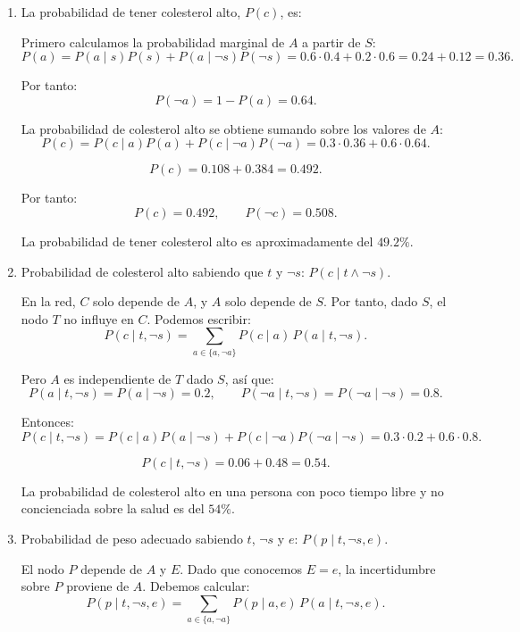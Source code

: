 \newpage
\begin{enumerate}[label=\alph*)]
\item La probabilidad de tener colesterol alto, $P(c)$, es:

Primero calculamos la probabilidad marginal de $A$ a partir de $S$:
\[
P(a) = P(a \mid s)P(s) + P(a \mid \lnot s)P(\lnot s)
     = 0.6 \cdot 0.4 + 0.2 \cdot 0.6
     = 0.24 + 0.12 = 0.36.
\]

Por tanto:
\[
P(\lnot a) = 1 - P(a) = 0.64.
\]

La probabilidad de colesterol alto se obtiene sumando sobre los valores de $A$:
\[
P(c) = P(c \mid a)P(a) + P(c \mid \lnot a)P(\lnot a)
     = 0.3 \cdot 0.36 + 0.6 \cdot 0.64.
\]

\[
P(c) = 0.108 + 0.384 = 0.492.
\]

Por tanto:
\[
P(c) = 0.492,\qquad P(\lnot c) = 0.508.
\]

La probabilidad de tener colesterol alto es aproximadamente del $49.2\%$. \\

\item Probabilidad de colesterol alto sabiendo que $t$ y $\lnot s$: $P(c \mid t \land \lnot s)$.

En la red, $C$ solo depende de $A$, y $A$ solo depende de $S$. Por tanto, dado $S$,
el nodo $T$ no influye en $C$. Podemos escribir:
\[
P(c \mid t, \lnot s) = \sum_{a \in \{a,\lnot a\}} P(c \mid a)\,P(a \mid t,\lnot s).
\]

Pero $A$ es independiente de $T$ dado $S$, así que:
\[
P(a \mid t,\lnot s) = P(a \mid \lnot s) = 0.2,\qquad
P(\lnot a \mid t,\lnot s) = P(\lnot a \mid \lnot s) = 0.8.
\]

Entonces:
\[
P(c \mid t,\lnot s) = P(c \mid a)P(a \mid \lnot s) + P(c \mid \lnot a)P(\lnot a \mid \lnot s)
= 0.3 \cdot 0.2 + 0.6 \cdot 0.8.
\]

\[
P(c \mid t,\lnot s) = 0.06 + 0.48 = 0.54.
\]

La probabilidad de colesterol alto en una persona con poco tiempo libre y no concienciada
sobre la salud es del $54\%$. \\

\item Probabilidad de peso adecuado sabiendo $t$, $\lnot s$ y $e$: $P(p \mid t,\lnot s,e)$.

El nodo $P$ depende de $A$ y $E$. Dado que conocemos $E=e$, la incertidumbre sobre $P$
proviene de $A$. Debemos calcular:
\[
P(p \mid t,\lnot s,e) = \sum_{a \in \{a,\lnot a\}} P(p \mid a,e)\,P(a \mid t,\lnot s,e).
\]


\end{enumerate}
